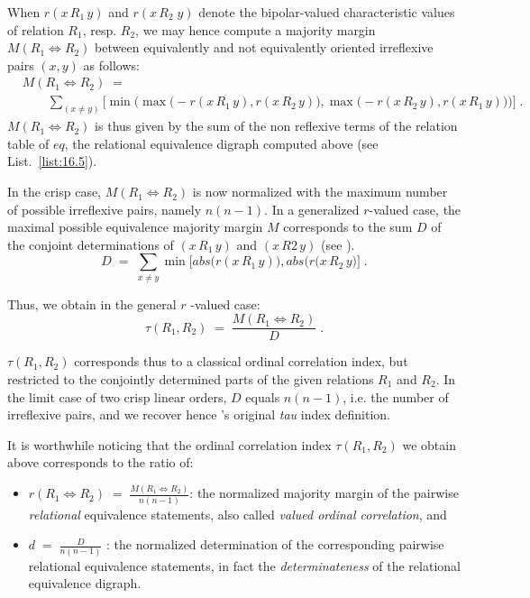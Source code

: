 When $r(x\,R_1\, y)$ and $r(x\,R_2\; y)$ denote the bipolar-valued characteristic values of relation $R_1$, resp. $R_2$, we may hence compute a majority margin $M(R_1 \Leftrightarrow R_2)$ between equivalently and not equivalently oriented irreflexive pairs $(x,y)$ as follows:
\begin{equation}\label{eq:16:2}
  \begin{split}
&M(R_1 \Leftrightarrow R_2) \; =\\
&\quad \quad \sum_{(x \neq y)} \Big[ \min \Big( \max \big( -r(x \,R_1\, y), r(x \,R_2\, y)\big), \max \big( -r(x \,R_2\, y), r(x \,R_1\, y)\big) \Big) \Big]\;.
\end{split}
\end{equation}
$M(R_1 \Leftrightarrow R_2)$ is thus given by the sum of the non reflexive terms of the relation table of $eq$, the relational equivalence digraph computed above (see List.~\vref{list:16.5}).

In the crisp case, $M(R_1 \Leftrightarrow R_2)$  is now normalized with the maximum number of possible irreflexive pairs, namely $n(n-1)$. In a generalized $r$-valued case, the maximal possible equivalence majority margin $M$ corresponds to the sum $D$ of the conjoint determinations of $(x \,R_1\, y)$ and $(x \,R2\, y)$ (see \citep{BIS-2012a}). 
\begin{equation}
  D \;=\; \sum_{x \neq y} \min \Big[ abs\big(r(x \,R_1\, y) \big), abs \big( r(x \,R_2\, y \big)  \Big]\;.
\end{equation}

Thus, we obtain in the general $r$ -valued case:
\begin{equation}
  \tau(R_1,R_2) \;=\; \frac{M(R_1 \Leftrightarrow R_2)}{D}\;.
\end{equation}

$\tau(R_1,R_2)$ corresponds thus to a classical ordinal correlation index, but restricted to the conjointly determined parts of the given relations $R_1$ and $R_2$. In the limit case of two crisp linear orders, $D$ equals $n(n-1)$, i.e. the number of irreflexive pairs, and we recover hence \Kendall 's original \emph{tau} index definition.

It is worthwhile noticing that the ordinal correlation index $\tau(R_1,R_2)$ we obtain above corresponds to the ratio of:
\begin{itemize}
\item $r(R_1 \Leftrightarrow R_2) \;=\; \frac{M(R_1 \Leftrightarrow R_2)}{n(n-1)}$: the normalized majority margin of the pairwise \emph{relational} equivalence statements, also called \emph{valued ordinal correlation}, and 
\item $d \;=\; \frac{D}{n(n-1)}$ : the normalized determination of the corresponding pairwise relational equivalence statements, in fact the \emph{determinateness} of the relational equivalence digraph.
\end{itemize}

